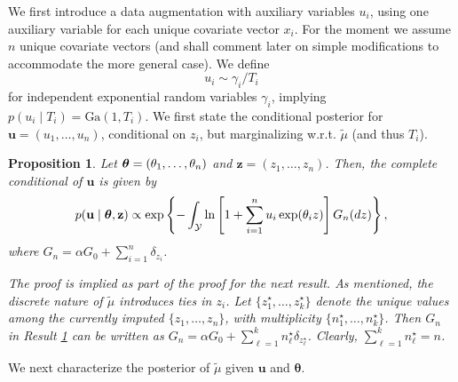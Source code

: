 \documentclass{article}[12pt]
\newcounter{theorem}
\newtheorem{proposition}{Proposition}
\newcommand{\blau}{\color{blue}}
\newcommand{\schwarz}{\color{black}}
\newcommand{\bch}{\blau\it}
\newcommand{\ech}{\schwarz\rm}
\newcommand{\refa}[1]{\textcolor{blue}{\ref{#1}}} %
\newcommand{\Ga}{\mbox{Ga}}
\renewcommand{\th}{\theta}
\newcommand{\tmu}{\widetilde{\mu}}
\newcommand{\sy}{\mathcal{Y}}
\newcommand{\bth}{\mbox{\boldmath $\theta$}}
\renewcommand{\sy}{\mathcal{Y}}
\newcommand{\ub}{\mathbf{u}}
\newcommand{\zb}{\mathbf{z}}
\newcommand{\thb}{\bm{\th}}
\begin{document}
We first introduce a data augmentation with auxiliary variables
$u_i$, using one auxiliary variable for each unique covariate vector
$x_i$. For the moment we assume $n$ unique covariate vectors (and
shall comment later on simple modifications to accommodate the more
general case). We define
$$
u_i \sim \gamma_i/T_i
$$
for independent exponential random variables $\gamma_i$, implying 
$p(u_i \mid T_i) = \Ga(1, T_i)$.
We first state the conditional posterior for
$\ub = (u_1, \dots, u_n)$, conditional on $z_i$, but marginalizing
w.r.t. $\tmu$ (and thus $T_i$). 
\begin{proposition}
\label{result2}
Let $\bth = (\theta_1, \dots, \theta_n)$ and $\zb = (z_1, \dots, z_n)$. Then, the complete conditional of $\ub$ is given by
$$
p(\ub \mid \bth, \zb) \propto \exp \left \{ - \int_{\sy} \ln \left[1+ \sum_{i=1}^n u_i \exp(\th_i  z) \right] G_n(dz) \right\}, 
$$
where $G_n = \alpha G_0 +  \sum_{i=1}^n \delta_{z_i}$.  
\end{proposition}
\bch The proof is implied as part of the proof for the next result. \ech
As mentioned, the discrete nature of $\tmu$ introduces ties
in $z_i$. Let $\{z^\star_1, \dots, z^\star_k\}$ denote the unique
values among the currently imputed $\{z_1,\ldots,z_n\}$,
with multiplicity $\{n^\star_1, \dots, n^\star_k\}$.
Then $G_n$ in Result \refa{result2} can be written as
$G_n = \alpha G_0 + \sum_{\ell = 1}^k n^\star_\ell
\delta_{z^\star_\ell}$.  Clearly, $\sum_{\ell=1}^k n^\star_\ell =
n$.

We next characterize the posterior of $\tmu$ given $\ub$ and $\thb$.
\end{document}
